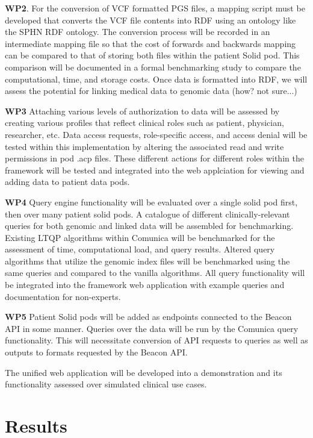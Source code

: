\documentclass[runningheads]{llncs}
\begin{document}
\textbf{WP2}.
For the conversion of VCF formatted PGS files, a mapping script must be developed that converts the VCF file contents into RDF using an ontology like the SPHN RDF ontology. 
The conversion process will be recorded in an intermediate mapping file so that the cost of forwards and backwards mapping can be compared to that of storing both files within the patient Solid pod. 
This comparison will be documented in a formal benchmarking study to compare the computational, time, and storage costs.
Once data is formatted into RDF, we will assess the potential for linking medical data to genomic data (how? not sure...)

\textbf{WP3}
Attaching various levels of authorization to data will be assessed by creating various profiles that reflect clinical roles such as patient, physician, researcher, etc. 
Data access requests, role-specific access, and access denial will be tested within this implementation by altering the associated read and write permissions in pod .acp files.
These different actions for different roles within the framework will be tested and integrated into the web applciation for viewing and adding data to patient data pods. 

\textbf{WP4}
Query engine functionality will be evaluated over a single solid pod first, then over many patient solid pods. 
A catalogue of different clinically-relevant queries for both genomic and linked data will be assembled for benchmarking.
Existing LTQP algorithms within Comunica will be benchmarked for the assessment of time, computational load, and query results.
Altered query algorithms that utilize the genomic index files will be benchmarked using the same queries and compared to the vanilla algorithms.
All query functionality will be integrated into the framework web application with example queries and documentation for non-experts.

\textbf{WP5}
Patient Solid pods will be added as endpoints connected to the Beacon API in some manner. 
Queries over the data will be run by the Comunica query functionality.
This will necessitate conversion of API requests to queries as well as outputs to formats requested by the Beacon API.

The unified web application will be developed into a demonstration and its functionality assessed over simulated clinical use cases.


\section{Results}

\end{document}
